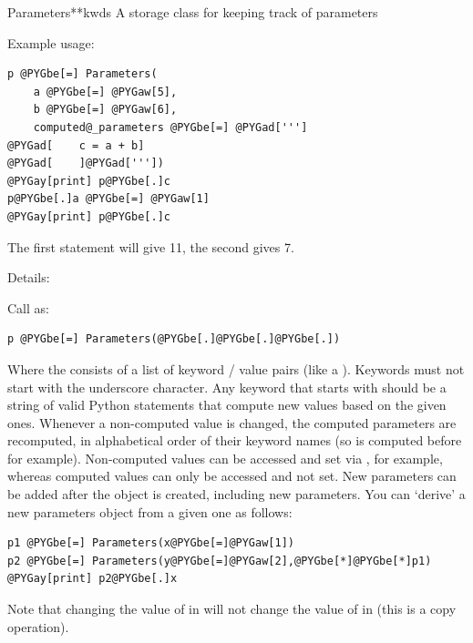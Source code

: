 \documentclass[letterpaper,10pt,english]{manual}
\begin{document}
\hypertarget{brian.Parameters}{}\begin{classdesc}{Parameters}{**kwds}
A storage class for keeping track of parameters

Example usage:

\begin{Verbatim}[commandchars=@\[\]]
p @PYGbe[=] Parameters(
    a @PYGbe[=] @PYGaw[5],
    b @PYGbe[=] @PYGaw[6],
    computed@_parameters @PYGbe[=] @PYGad[''']
@PYGad[    c = a + b]
@PYGad[    ]@PYGad['''])
@PYGay[print] p@PYGbe[.]c
p@PYGbe[.]a @PYGbe[=] @PYGaw[1]
@PYGay[print] p@PYGbe[.]c
\end{Verbatim}

The first  statement will give 11, the second gives 7.

Details:

Call as:

\begin{Verbatim}[commandchars=@\[\]]
p @PYGbe[=] Parameters(@PYGbe[.]@PYGbe[.]@PYGbe[.])
\end{Verbatim}

Where the  consists of a list of keyword / value pairs (like a ).
Keywords must not start with the underscore \code{\_} character. Any
keyword that starts with  should be a string of valid Python statements
that compute new values based on the given ones. Whenever a non-computed value is
changed, the computed parameters are recomputed, in alphabetical order of their
keyword names (so  is computed before  for example).
Non-computed values can be accessed and set via ,  for example, whereas
computed values can only be accessed and not set. New parameters can be added
after the \hyperlink{brian.Parameters}{} object is created, including new  parameters. You
can `derive' a new parameters object from a given one as follows:

\begin{Verbatim}[commandchars=@\[\]]
p1 @PYGbe[=] Parameters(x@PYGbe[=]@PYGaw[1])
p2 @PYGbe[=] Parameters(y@PYGbe[=]@PYGaw[2],@PYGbe[*]@PYGbe[*]p1)
@PYGay[print] p2@PYGbe[.]x
\end{Verbatim}

Note that changing the value of  in  will not change the value of  in  (this
is a copy operation).
\end{classdesc}

\resetcurrentobjects
\end{document}
